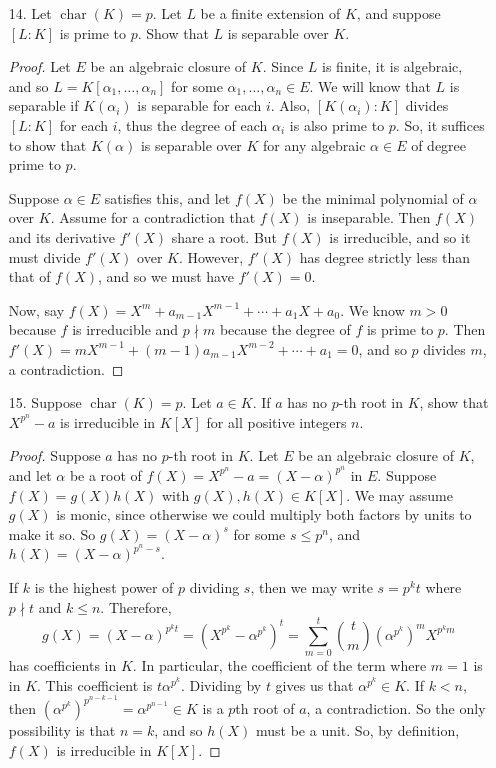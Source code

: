\documentclass[10pt]{article}
\DeclareMathOperator*{\Char}{char}
\begin{document}
\begin{enumerate}
\item[14.] Let $\Char(K) = p$.  Let $L$ be a finite extension of $K$, and suppose $[L:K]$ is prime to $p$.  Show that $L$ is separable over $K$.

\begin{proof}
Let $E$ be an algebraic closure of $K$.  Since $L$ is finite, it is algebraic, and so $L = K[\alpha_1, \dots , \alpha_n]$ for some $\alpha_1, \dots , \alpha_n \in E$.  We will know that $L$ is separable if $K(\alpha_i)$ is separable for each $i$.  Also, $[K(\alpha_i):K]$ divides $[L:K]$ for each $i$, thus the degree of each $\alpha_i$ is also prime to $p$.  So, it suffices to show that $K(\alpha)$ is separable over $K$ for any algebraic $\alpha \in E$ of degree prime to $p$.

Suppose $\alpha \in E$ satisfies this, and let $f(X)$ be the minimal polynomial of $\alpha$ over $K$.  Assume for a contradiction that $f(X)$ is inseparable.  Then $f(X)$ and its derivative $f'(X)$ share a root.  But $f(X)$ is irreducible, and so it must divide $f'(X)$ over $K$.  However, $f'(X)$ has degree strictly less than that of $f(X)$, and so we must have $f'(X) = 0$.

Now, say $f(X) = X^m + a_{m-1}X^{m-1} + \cdots + a_1 X + a_0$.  We know $m > 0$ because $f$ is irreducible and $p \nmid m$ because the degree of $f$ is prime to $p$.  Then $f'(X) = mX^{m-1} + (m-1)a_{m-1}X^{m-2} + \cdots + a_1 = 0$, and so $p$ divides $m$, a contradiction.
\end{proof}

\item[15.] Suppose $\Char(K)  = p$.  Let $a \in K$.  If $a$ has no $p$-th root in $K$, show that $X^{p^n} - a$ is irreducible in $K[X]$ for all positive integers $n$.

\begin{proof}
Suppose $a$ has no $p$-th root in $K$.  Let $E$ be an algebraic closure of $K$, and let $\alpha$ be a root of $f(X) = X^{p^n} - a = (X - \alpha)^{p^n}$ in $E$.  Suppose $f(X) = g(X)h(X)$ with $g(X),h(X) \in K[X]$.  We may assume $g(X)$ is monic, since otherwise we could multiply both factors by units to make it so.  So $g(X) = (X-\alpha)^s$ for some $s \leq p^n$, and $h(X) = (X-\alpha)^{p^n - s}$.

If $k$ is the highest power of $p$ dividing $s$, then we may write $s = p^k t$ where $p \nmid t$ and $k \leq n$.  Therefore,
$$g(X) = (X-\alpha)^{p^k t} = (X^{p^k} - \alpha^{p^k})^t = \sum_{m=0}^t \binom{t}{m} (\alpha^{p^k})^m X^{p^k m}$$
has coefficients in $K$.  In particular, the coefficient of the term where $m = 1$ is in $K$.  This coefficient is $t \alpha^{p^k}$.  Dividing by $t$ gives us that $\alpha^{p^k} \in K$.  If $k < n$, then $(\alpha^{p^k})^{p^{n-k - 1}} = \alpha^{p^{n-1}} \in K$ is a $p$th root of $a$, a contradiction.  So the only possibility is that $n = k$, and so $h(X)$ must be a unit.  So, by definition, $f(X)$ is irreducible in $K[X]$.
\end{proof}


\end{enumerate}
\end{document}
